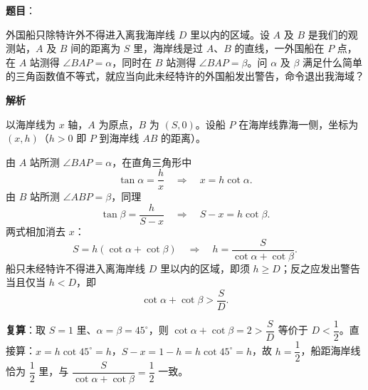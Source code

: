 \begin{answer}

\textbf{题目}：

外国船只除特许外不得进入离我海岸线 $D$ 里以内的区域。设 $A$ 及 $B$ 是我们的观测站，$A$ 及 $B$ 间的距离为 $S$ 里，海岸线是过 $A$、$B$ 的直线，一外国船在 $P$ 点，在 $A$ 站测得 $\angle BAP=\alpha$，同时在 $B$ 站测得 $\angle BAP=\beta$。问 $\alpha$ 及 $\beta$ 满足什么简单的三角函数值不等式，就应当向此未经特许的外国船发出警告，命令退出我海域？

\textbf{解析}

以海岸线为 $x$ 轴，$A$ 为原点，$B$ 为 $(S,0)$。设船 $P$ 在海岸线靠海一侧，坐标为 $(x,h)$（$h>0$ 即 $P$ 到海岸线 $AB$ 的距离）。

由 $A$ 站所测 $\angle BAP=\alpha$，在直角三角形中
\nopagebreak[4]
\[
\tan\alpha=\frac hx\quad\Longrightarrow\quad x=h\cot\alpha .
\]
由 $B$ 站所测 $\angle ABP=\beta$，同理
\nopagebreak[4]
\[
\tan\beta=\frac{h}{S-x}\quad\Longrightarrow\quad S-x=h\cot\beta .
\]
两式相加消去 $x$：
\nopagebreak[4]
\[
S=h(\cot\alpha+\cot\beta)\quad\Longrightarrow\quad h=\frac{S}{\cot\alpha+\cot\beta}.
\]
船只未经特许不得进入离海岸线 $D$ 里以内的区域，即须 $h\ge D$；反之应发出警告当且仅当 $h<D$，即
\nopagebreak[4]
\[
\cot\alpha+\cot\beta>\frac SD .
\]

\textbf{复算}：取 $S=1$ 里、$\alpha=\beta=45^\circ$，则 $\cot\alpha+\cot\beta=2>\dfrac SD$ 等价于 $D<\dfrac12$。直接算：$x=h\cot45^\circ=h$，$S-x=1-h=h\cot45^\circ=h$，故 $h=\dfrac12$，船距海岸线恰为 $\dfrac12$ 里，与 $\dfrac{S}{\cot\alpha+\cot\beta}=\dfrac12$ 一致。


\end{answer}
